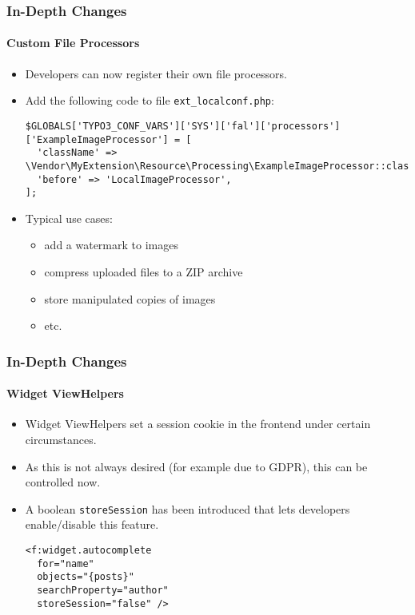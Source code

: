 
\begin{frame}[fragile]
	\frametitle{In-Depth Changes}
	\framesubtitle{Custom File Processors}

	\lstset{basicstyle=\tiny\ttfamily}

	\begin{itemize}
		\item Developers can now register their own file processors.
		\item Add the following code to file \texttt{ext\_localconf.php}:
\begin{lstlisting}
$GLOBALS['TYPO3_CONF_VARS']['SYS']['fal']['processors']['ExampleImageProcessor'] = [
  'className' => \Vendor\MyExtension\Resource\Processing\ExampleImageProcessor::class,
  'before' => 'LocalImageProcessor',
];
\end{lstlisting}

		\item Typical use cases:

			\begin{itemize}
				\item add a watermark to images
				\item compress uploaded files to a ZIP archive
				\item store manipulated copies of images
				\item etc.
			\end{itemize}

	\end{itemize}

\end{frame}


\begin{frame}[fragile]
	\frametitle{In-Depth Changes}
	\framesubtitle{Widget ViewHelpers}

	\lstset{basicstyle=\smaller\ttfamily}

	\begin{itemize}
		\item Widget ViewHelpers set a session cookie in the frontend under certain circumstances.
		\item As this is not always desired (for example due to GDPR), this can be controlled now.
		\item A boolean \texttt{storeSession} has been introduced that lets developers enable/disable this feature.
\begin{lstlisting}
<f:widget.autocomplete
  for="name"
  objects="{posts}"
  searchProperty="author"
  storeSession="false" />
\end{lstlisting}

	\end{itemize}

\end{frame}

